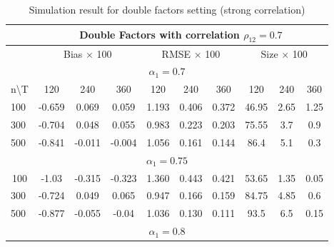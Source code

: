 \begin{table}[]
	\caption{Simulation result for double factors setting (strong correlation)}\label{table:exp4}
	\centering
	\begin{tabular}{lccccccccc}
		\hline
\hline
\multicolumn{1}{l|}{}    & \multicolumn{9}{c}{Double Factors with correlation $\rho_{12} = 0.7$}                                                                                                  \\ \hline
\multicolumn{1}{l|}{}    & \multicolumn{3}{c|}{Bias $\times$ 100}        & \multicolumn{3}{c|}{RMSE $\times$ 100}     & \multicolumn{3}{c}{Size $\times$ 100} \\ \hline
\multicolumn{10}{c}{$\alpha_1 = 0.7$}                                                                                                                         \\ \hline
\multicolumn{1}{l|}{n\textbackslash T}  & 120    & 240    & \multicolumn{1}{c|}{360}    & 120   & 240   & \multicolumn{1}{c|}{360}   & 120         & 240        & 360        \\ \hline
\multicolumn{1}{l|}{100} & -0.659 & 0.069  & \multicolumn{1}{c|}{0.059}  & 1.193 & 0.406 & \multicolumn{1}{c|}{0.372} & 46.95       & 2.65       & 1.25       \\
\multicolumn{1}{l|}{300} & -0.704 & 0.048  & \multicolumn{1}{c|}{0.055}  & 0.983 & 0.223 & \multicolumn{1}{c|}{0.203} & 75.55       & 3.7        & 0.9        \\
\multicolumn{1}{l|}{500} & -0.841 & -0.011 & \multicolumn{1}{c|}{-0.004} & 1.056 & 0.161 & \multicolumn{1}{c|}{0.144} & 86.4        & 5.1        & 0.3        \\ \hline
\multicolumn{10}{c}{$\alpha_1 = 0.75$}                                                                                                                        \\ \hline
\multicolumn{1}{c|}{100} & -1.03  & -0.315 & \multicolumn{1}{c|}{-0.323} & 1.360 & 0.443 & \multicolumn{1}{c|}{0.421} & 53.65       & 1.35       & 0.05       \\
\multicolumn{1}{l|}{300} & -0.724 & 0.049  & \multicolumn{1}{c|}{0.065}  & 0.947 & 0.166 & \multicolumn{1}{c|}{0.159} & 84.75       & 4.85       & 0.6        \\
\multicolumn{1}{l|}{500} & -0.877 & -0.055 & \multicolumn{1}{c|}{-0.04}  & 1.036 & 0.130 & \multicolumn{1}{c|}{0.111} & 93.5        & 6.5        & 0.15       \\ \hline
\multicolumn{10}{c}{$\alpha_1 = 0.8$}                                                                                                                         \\ \hline

\end{tabular}
\end{table}
